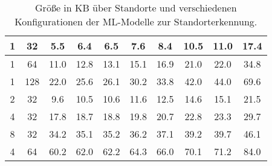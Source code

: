 \begin{table}[h!]
\begin{tabular}{ | c | c | c | c | c | c | c | c | c | c | }
        1 & 32 & 5.5 & 6.4 & 6.5 & 7.6 & 8.4 & 10.5 & 11.0 & 17.4 \\\hline
        1 & 64 & 11.0 & 12.8 & 13.1 & 15.1 & 16.9 & 21.0 & 22.0 & 34.8 \\\hline
        1 & 128 & 22.0 & 25.6 & 26.1 & 30.2 & 33.8 & 42.0 & 44.0 & 69.6 \\\hline
        2 & 32 & 9.6 & 10.5 & 10.6 & 11.6 & 12.5 & 14.6 & 15.1 & 21.5 \\\hline
        4 & 32 & 17.8 & 18.7 & 18.8 & 19.8 & 20.7 & 22.8 & 23.3 & 29.7 \\\hline
        8 & 32 & 34.2 & 35.1 & 35.2 & 36.2 & 37.1 & 39.2 & 39.7 & 46.1 \\\hline
        4 & 64 & 60.2 & 62.0 & 62.2 & 64.3 & 66.0 & 70.1 & 71.2 & 84.0 \\\hline
    \end{tabular}
    \caption{Größe in KB über Standorte und verschiedenen Konfigurationen der ML-Modelle zur Standorterkennung.}
    \label{tab:predictions_by_loc_size}
\end{table}
